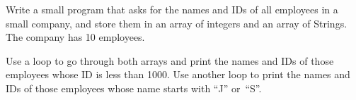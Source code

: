 Write a small program that asks for the names and IDs of all employees
in a small company, and store them in an array of integers and an
array of Strings. The company has 10 employees.

Use a loop to go through both arrays and print the names and IDs of
those employees whose ID is less than 1000. Use another loop to print
the names and IDs of those employees whose name starts with ``J''
or~``S''. 



